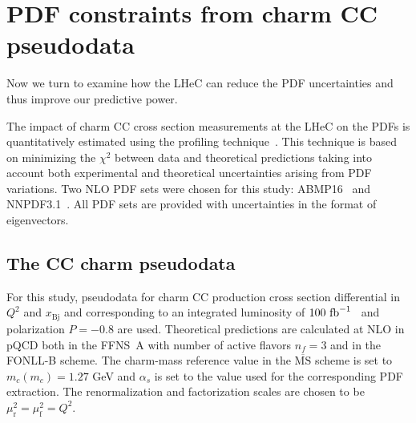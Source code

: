 \documentclass[pdftex,twocolumn,epjc3]{svjour3}          %
\newcommand{\abmp} {ABMP16\xspace}
\newcommand{\nnpdf} {NNPDF3.1\xspace}
\newcommand{\chisq}{\ensuremath{\chi^2}\xspace}
\newcommand{\xbj}{\ensuremath{x_{\text{Bj}}}\xspace}
\newcommand{\fonll} {{FONLL-B}\xspace}
\newcommand{\ffns} {{FFNS~A}\xspace}
\begin{document}
%
\section{PDF constraints from charm CC pseudodata}
\label{sec:PDF}

Now we turn to examine how the LHeC can reduce the PDF uncertainties
and thus improve our predictive power.

The impact of charm CC cross section measurements at the LHeC on the
PDFs is quantitatively estimated using the profiling
technique~\cite{Paukkunen:2014zia}. This technique is based on
minimizing the \chisq between data and theoretical predictions taking
into account both experimental and theoretical uncertainties arising
from PDF variations.
%
Two NLO PDF sets were chosen for this study:
\abmp~\cite{Alekhin:2018pai} and \nnpdf~\cite{Ball:2017nwa}. All PDF sets are provided with
uncertainties in the format of eigenvectors.

%
\subsection{The CC  charm pseudodata}
\label{sec:pseudodata}

For this study, pseudodata for charm CC production cross section
differential in $Q^2$ and \xbj and corresponding to an integrated
luminosity of $100{\rm~fb}^{-1}$~\cite{AbelleiraFernandez:2012cc,Blumlein:1992we} and
polarization $P=-0.8$ are used.
%
%
%
Theoretical predictions are calculated at NLO
in pQCD both in the \ffns with number of active flavors $n_f = 3$ and
in the \fonll scheme. The charm-mass reference value in the
$\overline{\mbox{MS}}$ scheme is set to $m_c(m_c) = 1.27$ GeV and
$\alpha_s$ is set to the value used for the corresponding PDF
extraction. The renormalization and factorization scales are chosen to
be $\mu_\mathrm{r}^2 = \mu_\mathrm{f}^2 = Q^2$.
\end{document}
